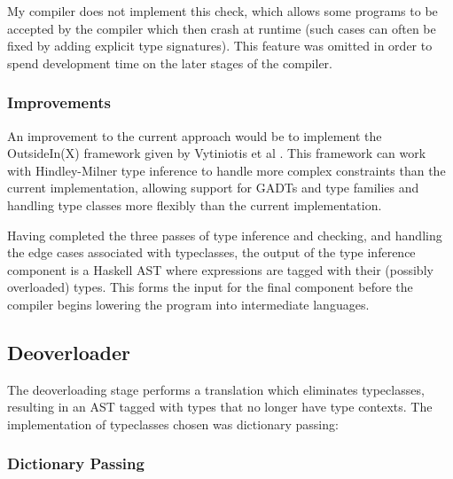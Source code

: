 \documentclass[dissertation.tex]{subfiles}
\begin{document}
{{{            My compiler does not implement this check, which allows some programs to be accepted by the compiler which
            then crash at runtime (such cases can often be fixed by adding explicit type signatures). This feature was
            omitted in order to spend development time on the later stages of the compiler.


        }
        \subsubsection{Improvements}
        {

            An improvement to the current approach would be to implement the OutsideIn(X) framework given by Vytiniotis
            et al \cite{OutsideIn}. This framework can work with Hindley-Milner type inference to handle more complex
            constraints than the current implementation, allowing support for GADTs and type families and handling type
            classes more flexibly than the current implementation.

        }

        \vspace{0.5cm}
        Having completed the three passes of type inference and checking, and handling the edge cases associated with
        typeclasses, the output of the type inference component is a Haskell AST where expressions are tagged with their
        (possibly overloaded) types. This forms the input for the final component before the compiler begins lowering
        the program into intermediate languages.

    }
    \subsection{Deoverloader}\label{sec:deoverloading}
    {

        The deoverloading stage performs a translation which eliminates typeclasses, resulting in an AST tagged with
        types that no longer have type contexts. The implementation of typeclasses chosen was dictionary passing:

        \subsubsection{Dictionary Passing}
        {

}}}
\end{document}
